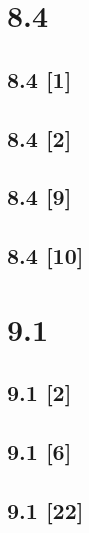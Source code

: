\documentclass{article}
\begin{document}
\newpage

\section*{8.4}
\setcounter{equation}{0}

\subsection*{8.4 [1]}
\subsection*{8.4 [2]}
\subsection*{8.4 [9]}
\subsection*{8.4 [10]}

\newpage

\section*{9.1}
\setcounter{equation}{0}

\subsection*{9.1 [2]}
\subsection*{9.1 [6]}
\subsection*{9.1 [22]}
\end{document}
